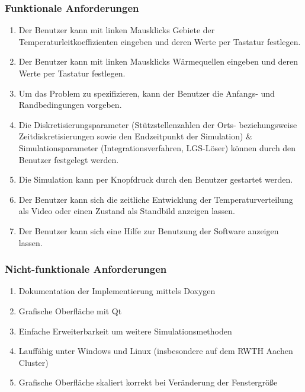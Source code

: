 \subsubsection*{Funktionale Anforderungen}

\begin{enumerate}
	\item Der Benutzer kann mit linken Mausklicks Gebiete der Temperaturleitkoeffizienten eingeben und deren Werte per Tastatur festlegen.
	\item Der Benutzer kann mit linken Mausklicks Wärmequellen eingeben und deren Werte per Tastatur festlegen.
	\item Um das Problem zu spezifizieren, kann der Benutzer die Anfangs- und Randbedingungen vorgeben.
	\item Die Diskretisierungsparameter (Stützstellenzahlen der Orts- beziehungsweise Zeitdiskretisierungen sowie den Endzeitpunkt der Simulation) \& Simulationsparameter (Integrationsverfahren, LGS-Löser) können durch den Benutzer festgelegt werden.
	\item Die Simulation kann per Knopfdruck durch den Benutzer gestartet werden.
	\item Der Benutzer kann sich die zeitliche Entwicklung der Temperaturverteilung als Video oder einen Zustand als Standbild anzeigen lassen.
	\item Der Benutzer kann sich eine Hilfe zur Benutzung der Software anzeigen lassen.
\end{enumerate}

\subsubsection*{Nicht-funktionale Anforderungen}

\begin{enumerate}
	\item Dokumentation der Implementierung mittels Doxygen
	\item Grafische Oberfläche mit Qt
	\item Einfache Erweiterbarkeit um weitere Simulationsmethoden
	\item Lauffähig unter Windows und Linux (insbesondere auf dem RWTH Aachen Cluster)
	\item Grafische Oberfläche skaliert korrekt bei Veränderung der Fenstergröße
\end{enumerate}

